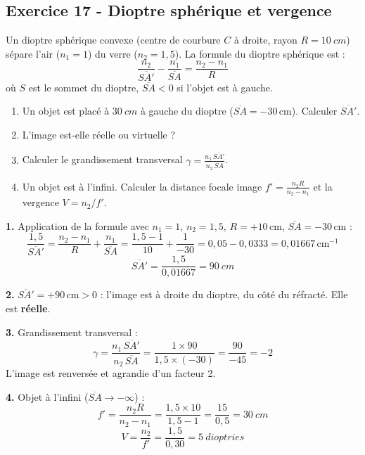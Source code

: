 \documentclass[12pt,a4paper]{article}
\begin{document}
\subsection*{Exercice 17 - Dioptre sphérique et vergence \niveau{\moyen}}

\begin{boiteexercice}
Un dioptre sphérique convexe (centre de courbure $C$ à droite, rayon $R = \qty{10}{cm}$) sépare l'air ($n_1 = 1$) du verre ($n_2 = 1{,}5$). La formule du dioptre sphérique est :
\[
\frac{n_2}{\overline{SA'}} - \frac{n_1}{\overline{SA}} = \frac{n_2 - n_1}{R}
\]
où $S$ est le sommet du dioptre, $\overline{SA} < 0$ si l'objet est à gauche.
\begin{enumerate}
  \item Un objet est placé à $\qty{30}{cm}$ à gauche du dioptre ($\overline{SA} = -30\,\text{cm}$). Calculer $\overline{SA'}$.
  \item L'image est-elle réelle ou virtuelle ?
  \item Calculer le grandissement transversal $\gamma = \frac{n_1\,\overline{SA'}}{n_2\,\overline{SA}}$.
  \item Un objet est à l'infini. Calculer la distance focale image $f' = \frac{n_2 R}{n_2 - n_1}$ et la vergence $V = n_2/f'$.
\end{enumerate}
\end{boiteexercice}

\begin{boitecorrige}
\textbf{1.} Application de la formule avec $n_1 = 1$, $n_2 = 1{,}5$, $R = +10\,\text{cm}$, $\overline{SA} = -30\,\text{cm}$ :
\[
\frac{1{,}5}{\overline{SA'}} = \frac{n_2 - n_1}{R} + \frac{n_1}{\overline{SA}} = \frac{1{,}5-1}{10} + \frac{1}{-30} = 0{,}05 - 0{,}0333 = 0{,}01667\,\text{cm}^{-1}
\]
\[
\overline{SA'} = \frac{1{,}5}{0{,}01667} = \qty{90}{cm}
\]

\textbf{2.} $\overline{SA'} = +90\,\text{cm} > 0$ : l'image est à droite du dioptre, du côté du réfracté. Elle est \textbf{réelle}.

\textbf{3.} Grandissement transversal :
\[
\gamma = \frac{n_1\,\overline{SA'}}{n_2\,\overline{SA}} = \frac{1\times90}{1{,}5\times(-30)} = \frac{90}{-45} = -2
\]
L'image est renversée et agrandie d'un facteur 2.

\textbf{4.} Objet à l'infini ($\overline{SA}\to-\infty$) :
\[
f' = \frac{n_2 R}{n_2 - n_1} = \frac{1{,}5\times10}{1{,}5-1} = \frac{15}{0{,}5} = \qty{30}{cm}
\]
\[
V = \frac{n_2}{f'} = \frac{1{,}5}{0{,}30} = \qty{5}{dioptries}
\]
\end{boitecorrige}
\end{document}
